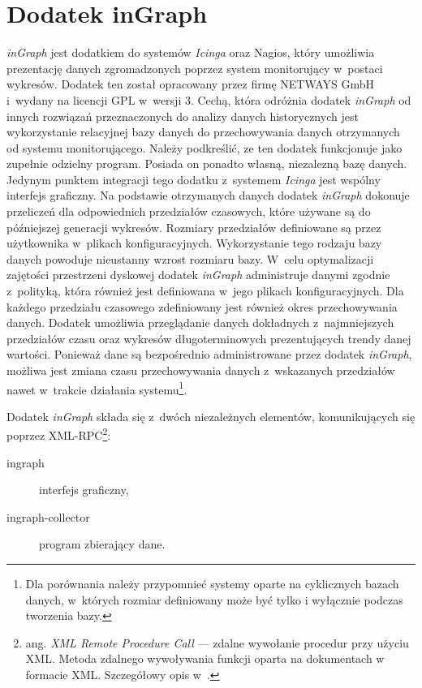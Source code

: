 \section[Dodatek inGraph][Dodatek inGraph]{Dodatek inGraph}
\label{sec:inGraph}

{\em inGraph} jest dodatkiem do systemów {\em Icinga} oraz Nagios, który umożliwia
prezentację danych zgromadzonych poprzez system monitorujący w~postaci
wykresów. Dodatek ten został opracowany przez firmę NETWAYS GmbH
i~wydany na licencji GPL w~wersji 3. Cechą, która odróżnia dodatek
{\em inGraph} od innych rozwiązań przeznaczonych do analizy danych
historycznych jest wykorzystanie relacyjnej bazy danych do
przechowywania danych otrzymanych od systemu monitorującego. Należy
podkreślić, ze ten dodatek funkcjonuje jako zupełnie odzielny
program. Posiada on ponadto własną, niezalezną bazę danych. Jedynym
punktem integracji tego dodatku z~systemem {\em Icinga} jest wspólny
interfejs graficzny.  Na podstawie otrzymanych danych dodatek {\em inGraph}
dokonuje przeliczeń dla odpowiednich przedziałów czasowych, które
używane są do późniejszej generacji wykresów. Rozmiary przedziałów
definiowane są przez użytkownika w~plikach
konfiguracyjnych. Wykorzystanie tego rodzaju bazy danych powoduje
nieustanny wzrost rozmiaru bazy. W~celu optymalizacji zajętości
przestrzeni dyskowej dodatek {\em inGraph} administruje danymi zgodnie
z~polityką, która również jest definiowana w~jego plikach
konfiguracyjnych. Dla każdego przedziału czasowego zdefiniowany jest
również okres przechowywania danych. Dodatek umożliwia przeglądanie
danych dokładnych z~najmniejszych przedziałów czasu oraz wykresów
długoterminowych prezentujących trendy danej wartości. Ponieważ dane
są bezpośrednio administrowane przez dodatek {\em inGraph}, możliwa jest
zmiana czasu przechowywania danych z~wskazanych przedziałów nawet
w~trakcie działania systemu\footnote{Dla porównania należy przypomnieć
  systemy oparte na cyklicznych bazach danych, w~których rozmiar
  definiowany może być tylko i wyłącznie podczas tworzenia bazy.}.

Dodatek {\em inGraph} składa się z~dwóch niezależnych elementów,
komunikujących się poprzez XML-RPC\footnote{ang. {\em XML Remote
    Procedure Call} --- zdalne wywołanie procedur przy użyciu
  XML. Metoda zdalnego wywoływania funkcji oparta na dokumentach w
  formacie XML. Szczegółowy opis w~\cite{www:XMLRPC}.}:

\begin{description}
\item[ingraph] interfejs graficzny,
\item[ingraph-collector] program zbierający dane.
\end{description}

